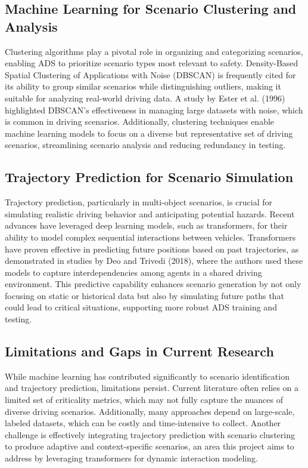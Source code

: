 \documentclass[12pt,a4paper]{report}
\begin{document}
\subsection*{Machine Learning for Scenario Clustering and Analysis}

Clustering algorithms play a pivotal role in organizing and categorizing scenarios, enabling ADS to prioritize scenario types most relevant to safety. Density-Based Spatial Clustering of Applications with Noise (DBSCAN) is frequently cited for its ability to group similar scenarios while distinguishing outliers, making it suitable for analyzing real-world driving data. A study by Ester et al. (1996) highlighted DBSCAN’s effectiveness in managing large datasets with noise, which is common in driving scenarios. Additionally, clustering techniques enable machine learning models to focus on a diverse but representative set of driving scenarios, streamlining scenario analysis and reducing redundancy in testing.


\subsection*{Trajectory Prediction for Scenario Simulation}

Trajectory prediction, particularly in multi-object scenarios, is crucial for simulating realistic driving behavior and anticipating potential hazards. Recent advances have leveraged deep learning models, such as transformers, for their ability to model complex sequential interactions between vehicles. Transformers have proven effective in predicting future positions based on past trajectories, as demonstrated in studies by Deo and Trivedi (2018), where the authors used these models to capture interdependencies among agents in a shared driving environment. This predictive capability enhances scenario generation by not only focusing on static or historical data but also by simulating future paths that could lead to critical situations, supporting more robust ADS training and testing.


\subsection*{Limitations and Gaps in Current Research}

While machine learning has contributed significantly to scenario identification and trajectory prediction, limitations persist. Current literature often relies on a limited set of criticality metrics, which may not fully capture the nuances of diverse driving scenarios. Additionally, many approaches depend on large-scale, labeled datasets, which can be costly and time-intensive to collect. Another challenge is effectively integrating trajectory prediction with scenario clustering to produce adaptive and context-specific scenarios, an area this project aims to address by leveraging transformers for dynamic interaction modeling.
\end{document}
